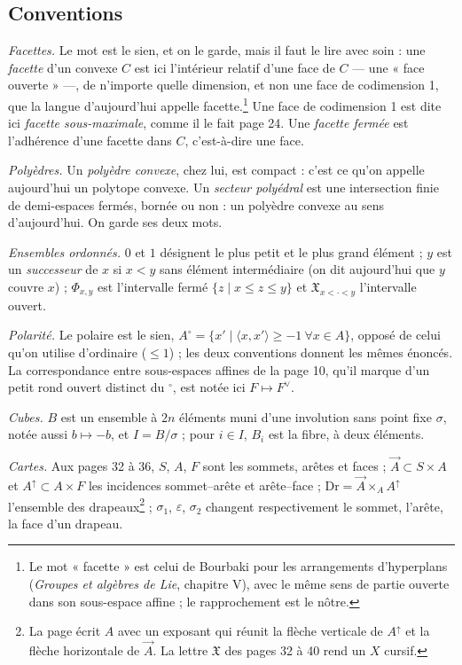 \documentclass[11pt,a4paper]{article}
\begin{document}
\subsection*{Conventions}

\emph{Facettes.} Le mot est le sien, et on le garde, mais il faut le lire avec
soin : une \emph{facette} d'un convexe $C$ est ici l'intérieur relatif d'une
face de $C$ --- une « face ouverte » ---, de n'importe quelle dimension, et non
une face de codimension 1, que la langue d'aujourd'hui appelle
facette.\footnote{Le mot « facette » est celui de Bourbaki pour les
arrangements d'hyperplans (\emph{Groupes et algèbres de Lie}, chapitre V),
avec le même sens de partie ouverte dans son sous-espace affine ; le
rapprochement est le nôtre.} Une face de codimension 1 est dite ici
\emph{facette sous-maximale}, comme il le fait page 24. Une \emph{facette
fermée} est l'adhérence d'une facette dans $C$, c'est-à-dire une face.

\emph{Polyèdres.} Un \emph{polyèdre convexe}, chez lui, est compact : c'est ce
qu'on appelle aujourd'hui un polytope convexe. Un \emph{secteur polyédral} est
une intersection finie de demi-espaces fermés, bornée ou non : un polyèdre
convexe au sens d'aujourd'hui. On garde ses deux mots.

\emph{Ensembles ordonnés.} $0$ et $1$ désignent le plus petit et le plus grand
élément ; $y$ est un \emph{successeur} de $x$ si $x < y$ sans élément
intermédiaire (on dit aujourd'hui que $y$ couvre $x$) ; $\Phi_{x,y}$ est
l'intervalle fermé $\{z \mid x \leq z \leq y\}$ et $\mathfrak{X}_{x < \cdot < y}$
l'intervalle ouvert.

\emph{Polarité.} Le polaire est le sien,
$A^{\circ} = \{x' \mid \langle x, x' \rangle \geq -1 \ \forall x \in A\}$,
opposé de celui qu'on utilise d'ordinaire ($\leq 1$) ; les deux conventions
donnent les mêmes énoncés. La correspondance entre sous-espaces affines de la
page 10, qu'il marque d'un petit rond ouvert distinct du $^{\circ}$, est notée
ici $F \mapsto F^{\vee}$.

\emph{Cubes.} $B$ est un ensemble à $2n$ éléments muni d'une involution sans
point fixe $\sigma$, notée aussi $b \mapsto -b$, et $I = B/\sigma$ ; pour
$i \in I$, $B_i$ est la fibre, à deux éléments.

\emph{Cartes.} Aux pages 32 à 36, $S$, $A$, $F$ sont les sommets, arêtes et
faces ; $\vec{A} \subset S \times A$ et $A^{\uparrow} \subset A \times F$ les
incidences sommet--arête et arête--face ; $\mathrm{Dr} = \vec{A} \times_{A}
A^{\uparrow}$ l'ensemble des drapeaux\footnote{La page écrit $A$ avec un
exposant qui réunit la flèche verticale de $A^{\uparrow}$ et la flèche
horizontale de $\vec{A}$. La lettre $\mathfrak{X}$ des pages 32 à 40 rend un $X$
cursif.} ; $\sigma_{1}$, $\varepsilon$, $\sigma_{2}$ changent respectivement le
sommet, l'arête, la face d'un drapeau.
\end{document}
